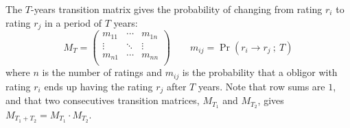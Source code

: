 \documentclass[11pt,fleqn]{book} %
\begin{document}
\begin{definition}
	\label{def:tm}
	The $T$-years transition matrix gives the probability of changing 
	from rating $r_i$ to rating $r_j$ in a period of $T$ years:
	\small
	\begin{displaymath}
		M_T = \left(
		\begin{array}{ccc}
			m_{11} & \cdots & m_{1n} \\
			\vdots & \ddots & \vdots \\
			m_{n1} & \cdots & m_{nn} \\
		\end{array}
		\right)
		\qquad
		m_{ij} = \Pr(r_i \to r_j\ ;\ T)
	\end{displaymath}
	where $n$ is the number of ratings and $m_{ij}$ is the probability that a
	obligor with rating $r_i$ ends up having the rating $r_j$ after $T$ years.
	Note that row sums are $1$, and that two consecutives transition matrices, 
	$M_{T_1}$ and $M_{T_2}$, gives $M_{T_1+T_2} = M_{T_1} \cdot M_{T_2}$.
\end{definition}
\end{document}
